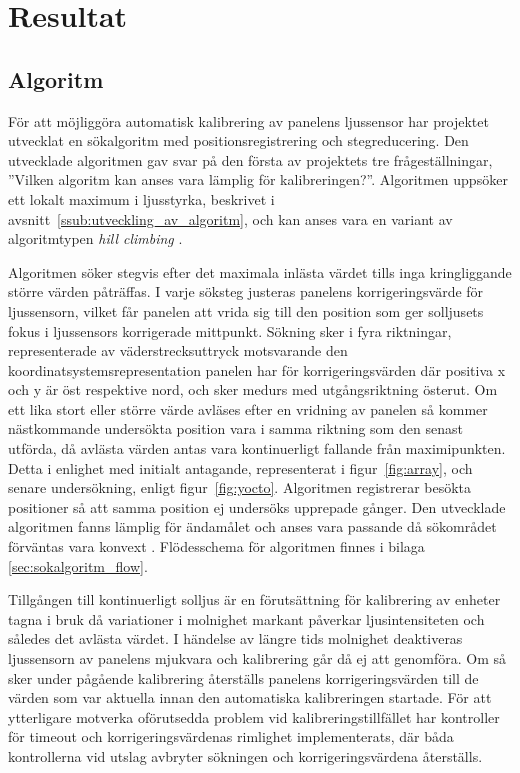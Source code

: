 \section{Resultat} %
\label{sec:resultat}
    \subsection{Algoritm} %
    \label{sub:algoritm}
        För att möjliggöra automatisk kalibrering av panelens ljussensor har projektet utvecklat en sökalgoritm med positionsregistrering och stegreducering. Den utvecklade algoritmen gav svar på den första av projektets tre frågeställningar, ''Vilken algoritm kan anses vara lämplig för kalibreringen?''. Algoritmen uppsöker ett lokalt maximum i ljusstyrka, beskrivet i avsnitt~\ref{ssub:utveckling_av_algoritm}, och kan anses vara en variant av algoritmtypen \textit{hill climbing} \cite{hill_climbing}. \bigskip

        Algoritmen söker stegvis efter det maximala inlästa värdet tills inga kringliggande större värden påträffas. I varje söksteg justeras panelens korrigeringsvärde för ljussensorn, vilket får panelen att vrida sig till den position som ger solljusets fokus i ljussensors korrigerade mittpunkt. Sökning sker i fyra riktningar, representerade av väderstrecksuttryck motsvarande den koordinatsystemsrepresentation panelen har för korrigeringsvärden där positiva x och y är öst respektive nord, och sker medurs med utgångsriktning österut. Om ett lika stort eller större värde avläses efter en vridning av panelen så kommer nästkommande undersökta position vara i samma riktning som den senast utförda, då avlästa värden antas vara kontinuerligt fallande från maximipunkten. Detta i enlighet med initialt antagande, representerat i figur~\ref{fig:array}, och senare undersökning, enligt figur~\ref{fig:yocto}. Algoritmen registrerar besökta positioner så att samma position ej undersöks upprepade gånger. Den utvecklade algoritmen fanns lämplig för ändamålet och anses vara passande då sökområdet förväntas vara konvext \cite{hill_climbing}. Flödesschema för algoritmen finnes i bilaga \ref{sec:sokalgoritm_flow}. \bigskip

        Tillgången till kontinuerligt solljus är en förutsättning för kalibrering av enheter tagna i bruk då variationer i molnighet markant påverkar ljusintensiteten och således det avlästa värdet. I händelse av längre tids molnighet deaktiveras ljussensorn av panelens mjukvara och kalibrering går då ej att genomföra. Om så sker under pågående kalibrering återställs panelens korrigeringsvärden till de värden som var aktuella innan den automatiska kalibreringen startade. För att ytterligare motverka oförutsedda problem vid kalibreringstillfället har kontroller för timeout och korrigeringsvärdenas rimlighet implementerats, där båda kontrollerna vid utslag avbryter sökningen och korrigeringsvärdena återställs.

